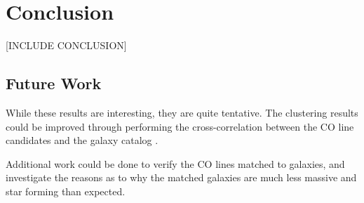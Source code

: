 \documentclass[twoside,single]{lion-msc}
\begin{document}
\chapter{Conclusion}

[INCLUDE CONCLUSION]

\section{Future Work}

While these results are interesting, they are quite tentative. The clustering results could be improved through performing the cross-correlation between the CO line candidates and the galaxy catalog \cite{hickox2011clustering, 10.1111/j.1365-2966.2011.20303.x, 10.1111/j.1365-2966.2008.14071.x}. 

Additional work could be done to verify the CO lines matched to galaxies, and investigate the reasons as to why the matched galaxies are much less massive and star forming than expected.

\appendix




\end{document}
